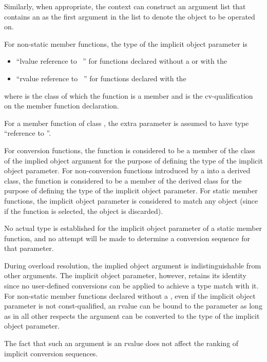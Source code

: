 \pnum
Similarly, when appropriate, the context can construct an
argument list that contains an
as the first argument in the list to denote
the object to be operated on.

\pnum
For non-static member functions, the type of the implicit object
parameter is
\begin{itemize}
\item ``lvalue reference to \cv{}~'' for functions declared
without a  or with the
\tcode{\&} 
\item ``rvalue reference to \cv{}~'' for functions declared with the
\tcode{\&\&} 
\end{itemize}
where
is the class of which the function is a member and
\cv{}
is the cv-qualification on the
member function declaration.
\begin{example}
For a
member
function of class
,
the extra parameter is assumed to have type
``reference to
''.
\end{example}
For conversion functions, the function is considered to be a member of the
class of the implied object argument for the purpose of defining the
type of the implicit object parameter.
For non-conversion functions
introduced by a
into a derived class, the function is
considered to be a member of the derived class for the purpose of defining
the type of the implicit object parameter.
For static member functions, the implicit object parameter is considered
to match any object (since if the function is selected, the object is
discarded).
\begin{note}
No actual type is established for the implicit object parameter
of a static member function, and no attempt will be made to determine a
conversion sequence for that parameter.
\end{note}

\pnum
{}%
During overload resolution, the implied object argument is
indistinguishable from other arguments.
The implicit object
parameter, however, retains its identity since
no user-defined conversions can be applied to achieve a type
match with it.
%
For non-static member functions declared without a ,
even if the implicit object parameter is not const-qualified,
an rvalue can be bound to the parameter
as long as in all other respects the argument can be
converted to the type of the implicit object parameter.
\begin{note}
The fact that such an argument is an rvalue does not
affect the ranking of implicit conversion sequences.
\end{note}

